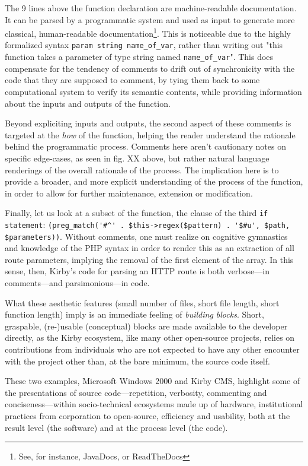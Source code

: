 The 9 lines above the function declaration are machine-readable documentation. It can be parsed by a programmatic system and used as input to generate more classical, human-readable documentation\footnote{See, for instance, JavaDocs, or ReadTheDocs}. This is noticeable due to the highly formalized syntax \lstinline{param string name_of_var}, rather than writing out "this function takes a parameter of type string named \lstinline{name_of_var}". This does compensate for the tendency of comments to drift out of synchronicity with the code that they are supposed to comment, by tying them back to some computational system to verify its semantic contents, while providing information about the inputs and outputs of the function.

Beyond expliciting inputs and outputs, the second aspect of these comments is targeted at the \emph{how} of the function, helping the reader understand the rationale behind the programmatic process. Comments here aren't cautionary notes on specific edge-cases, as seen in fig. XX above, but rather natural language renderings of the overall rationale of the process. The implication here is to provide a broader, and more explicit understanding of the process of the function, in order to allow for further maintenance, extension or modification.

Finally, let us look at a subset of the function, the clause of the third \lstinline{if statement}: \lstinline{(preg_match('#^' . $this->regex($pattern) . '$#u', $path, $parameters))}. Without comments, one must realize on cognitive gymnastics and knowledge of the PHP syntax in order to render this as an extraction of all route parameters, implying the removal of the first element of the array. In this sense, then, Kirby's code for parsing an HTTP route is both verbose—in comments—and parsimonious—in code.

What these aesthetic features (small number of files, short file length, short function length) imply is an immediate feeling of \emph{building blocks}. Short, graspable, (re-)usable (conceptual) blocks are made available to the developer directly, as the Kirby ecosystem, like many other open-source projects, relies on contributions from individuals who are not expected to have any other encounter with the project other than, at the bare minimum, the source code itself.

\vspace*{1\baselineskip}

These two examples, Microsoft Windows 2000 and Kirby CMS, highlight some of the presentations of source code—repetition, verbosity, commenting and conciseness—within socio-technical ecosystems made up of hardware, institutional practices from corporation to open-source, efficiency and usability, both at the result level (the software) and at the process level (the code).

